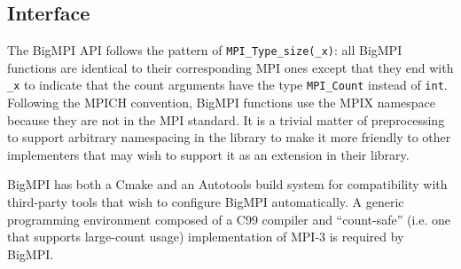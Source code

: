 
\subsection{Interface}

The BigMPI API follows the pattern of \texttt{MPI\_Type\_size(\_x)}: 
all BigMPI functions are identical to their corresponding MPI ones except that
they end with \texttt{\_x} to indicate that the count arguments have the type
\texttt{MPI\_Count} instead of \texttt{int}.
Following the MPICH convention, BigMPI functions use the 
MPIX namespace because they are not in the MPI standard.
It is a trivial matter of preprocessing to support arbitrary namespacing
in the library to make it more friendly to other implementers that
may wish to support it as an extension in their library.


BigMPI has both a Cmake and an Autotools build system for compatibility
with third-party tools that wish to configure BigMPI automatically.
A generic programming environment composed of a C99 compiler 
and ``count-safe'' (i.e. one that supports large-count usage) 
implementation of MPI-3 is required by BigMPI.